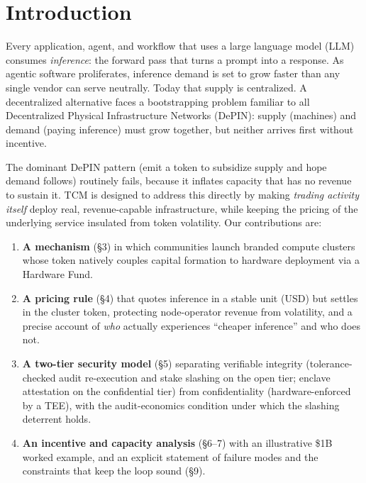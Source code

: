 \documentclass[11pt]{article}
\begin{document}
\section{Introduction}
Every application, agent, and workflow that uses a large language model (LLM) consumes \textit{inference}: the forward pass that turns a prompt into a response. As agentic software proliferates, inference demand is set to grow faster than any single vendor can serve neutrally. Today that supply is centralized. A decentralized alternative faces a bootstrapping problem familiar to all Decentralized Physical Infrastructure Networks (DePIN): supply (machines) and demand (paying inference) must grow together, but neither arrives first without incentive.

The dominant DePIN pattern (emit a token to subsidize supply and hope demand follows) routinely fails, because it inflates capacity that has no revenue to sustain it. TCM is designed to address this directly by making \textit{trading activity itself} deploy real, revenue-capable infrastructure, while keeping the pricing of the underlying service insulated from token volatility. Our contributions are:
\begin{enumerate}[leftmargin=1.4em,itemsep=0.2em]
\item \textbf{A mechanism} (\S3) in which communities launch branded compute clusters whose token natively couples capital formation to hardware deployment via a Hardware Fund.
\item \textbf{A pricing rule} (\S4) that quotes inference in a stable unit (USD) but settles in the cluster token, protecting node-operator revenue from volatility, and a precise account of \textit{who} actually experiences ``cheaper inference'' and who does not.
\item \textbf{A two-tier security model} (\S5) separating verifiable integrity (tolerance-checked audit re-execution and stake slashing on the open tier; enclave attestation on the confidential tier) from confidentiality (hardware-enforced by a TEE), with the audit-economics condition under which the slashing deterrent holds.
\item \textbf{An incentive and capacity analysis} (\S6--7) with an illustrative \$1B worked example, and an explicit statement of failure modes and the constraints that keep the loop sound (\S9).
\end{enumerate}
\end{document}
